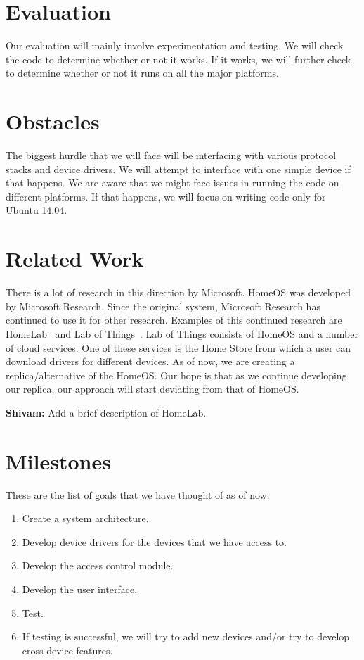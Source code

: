 \documentclass[letterpaper,12pt]{article}
\begin{document}
\section{Evaluation}
Our evaluation will mainly involve experimentation and testing. We will check the code to determine whether or not it works. If it works, we will further check to determine whether or not it runs on all the major platforms.

\section{Obstacles}
The biggest hurdle that we will face will be interfacing with various protocol stacks and device drivers. We will attempt to interface with one simple device if that happens. We are aware that we might face issues in running the code on different platforms. If that happens, we will focus on writing code only for Ubuntu 14.04.

\section{Related Work}
There is a lot of research in this direction by Microsoft.  HomeOS was developed by Microsoft Research.  Since the original system, Microsoft Research has continued to use it for other research. Examples of this continued research are HomeLab~\cite{homeLab} and Lab of Things~\cite{labOfThings}. Lab of Things consists of HomeOS and a number of cloud services. One of these services is the Home Store from which a user can download drivers for different devices. As of now, we are creating a replica/alternative of the HomeOS. Our hope is that as we continue developing our replica, our approach will start deviating from that of HomeOS.

\textbf{Shivam:} Add a brief description of HomeLab.

\section{Milestones}
These are the list of goals that we have thought of as of now.
\begin{enumerate}
 \item Create a system architecture.
 \item Develop device drivers for the devices that we have access to.
 \item Develop the access control module.
 \item Develop the user interface.
 \item Test.
 \item If testing is successful, we will try to add new devices and/or try to develop cross device features.
\end{enumerate}



\end{document}
